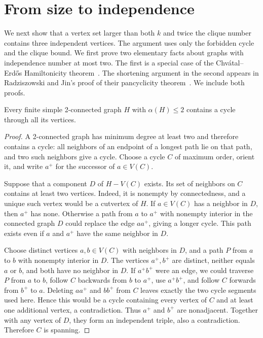 \section{From size to independence}\label{sec:size}

We next show that a vertex set larger than both $k$ and twice the clique
number contains three independent vertices.  The argument uses only the
forbidden cycle and the clique bound.  We first prove two elementary facts
about graphs with independence number at most two.
The first is a special case of the Chv\'atal--Erd\H{o}s Hamiltonicity
theorem~\cite[Theorem~1]{ChvatalErdos1972}. The shortening argument in the
second appears in Radziszowski and Jin's proof of their pancyclicity
theorem~\cite[Theorem~2]{RadziszowskiJin1994}. We include both proofs.

\begin{lemma}\label{size:hamiltonian}
Every finite simple 2-connected graph $H$ with $\alpha(H)\le2$ contains a
cycle through all its vertices.
\end{lemma}

\begin{proof}
A 2-connected graph has minimum degree at least two and therefore contains
a cycle: all neighbors of an endpoint of a longest path lie on that path,
and two such neighbors give a cycle.  Choose a cycle $C$ of maximum order,
orient it, and write $a^+$ for the successor of $a\in V(C)$.

Suppose that a component $D$ of $H-V(C)$ exists.  Its set of neighbors on
$C$ contains at least two vertices.  Indeed, it is nonempty by
connectedness, and a unique such vertex would be a cutvertex of $H$.
If $a\in V(C)$ has a neighbor in $D$, then $a^+$ has none.  Otherwise a
path from $a$ to $a^+$ with nonempty interior in the connected graph $D$
could replace the edge $aa^+$, giving a longer cycle.  This path exists
even if $a$ and $a^+$ have the same neighbor in $D$.

Choose distinct vertices $a,b\in V(C)$ with neighbors in $D$, and a path
$P$ from $a$ to $b$ with nonempty interior in $D$.  The vertices $a^+,b^+$
are distinct, neither equals $a$ or $b$, and both have no neighbor in $D$.
If $a^+b^+$ were an edge, we could traverse $P$ from $a$ to $b$, follow
$C$ backwards from $b$ to $a^+$, use $a^+b^+$, and follow $C$ forwards
from $b^+$ to $a$.  Deleting $aa^+$ and $bb^+$ from $C$ leaves exactly
the two cycle segments used here.  Hence this would be a cycle containing
every vertex of $C$ and at least one additional vertex, a contradiction.
Thus $a^+$ and $b^+$ are nonadjacent.  Together with any vertex of $D$,
they form an independent triple, also a contradiction.  Therefore $C$
is spanning.
\end{proof}

